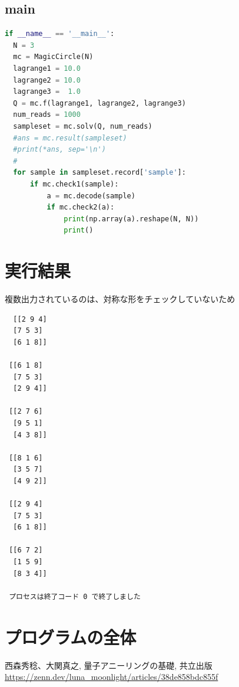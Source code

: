 \documentclass[uplatex,dvipdfmx,a4paper,11pt,oneside,openany]{jsbook}
\begin{document}
\subsection{main}

\begin{lstlisting}[language=Python]
if __name__ == '__main__':
  N = 3
  mc = MagicCircle(N)
  lagrange1 = 10.0
  lagrange2 = 10.0
  lagrange3 =  1.0
  Q = mc.f(lagrange1, lagrange2, lagrange3)
  num_reads = 1000
  sampleset = mc.solv(Q, num_reads)
  #ans = mc.result(sampleset)
  #print(*ans, sep='\n')
  #
  for sample in sampleset.record['sample']:
      if mc.check1(sample):
          a = mc.decode(sample)
          if mc.check2(a):
              print(np.array(a).reshape(N, N))
              print()
\end{lstlisting}


\section{実行結果}

複数出力されているのは、対称な形をチェックしていないため

\begin{verbatim}
  [[2 9 4]
  [7 5 3]
  [6 1 8]]

 [[6 1 8]
  [7 5 3]
  [2 9 4]]

 [[2 7 6]
  [9 5 1]
  [4 3 8]]

 [[8 1 6]
  [3 5 7]
  [4 9 2]]

 [[2 9 4]
  [7 5 3]
  [6 1 8]]

 [[6 7 2]
  [1 5 9]
  [8 3 4]]

 プロセスは終了コード 0 で終了しました
\end{verbatim}

\section{プログラムの全体}



\begin{thebibliography}{9}
   西森秀稔、大関真之, 量子アニーリングの基礎, 共立出版
   \url{https://zenn.dev/luna_moonlight/articles/38de858bdc855f}
\end{thebibliography}
\end{document}
